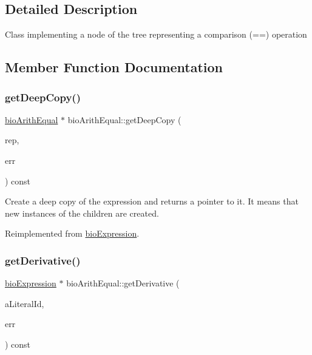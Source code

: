 \subsection{Detailed Description}
Class implementing a node of the tree representing a comparison (==) operation 

\subsection{Member Function Documentation}
\mbox{\label{classbio_arith_equal_a01b4bf9f63da99bf1ef17c518d2f6eab}} 
\subsubsection{\texorpdfstring{get\+Deep\+Copy()}{getDeepCopy()}}
{\footnotesize\ttfamily \hyperlink{classbio_arith_equal}{bio\+Arith\+Equal} $\ast$ bio\+Arith\+Equal\+::get\+Deep\+Copy (\begin{DoxyParamCaption}\item[{\hyperlink{classbio_expression_repository}{bio\+Expression\+Repository} $\ast$}]{rep,  }\item[{pat\+Error $\ast$\&}]{err }\end{DoxyParamCaption}) const\hspace{0.3cm}{\ttfamily [virtual]}}

Create a deep copy of the expression and returns a pointer to it. It means that new instances of the children are created. 

Reimplemented from \hyperlink{classbio_expression_a4ee1b8add634078a02eaae26cd40dcc8}{bio\+Expression}.

\mbox{\label{classbio_arith_equal_a91d4c7481582a8a039dc373eddc707b8}} 
\subsubsection{\texorpdfstring{get\+Derivative()}{getDerivative()}}
{\footnotesize\ttfamily \hyperlink{classbio_expression}{bio\+Expression} $\ast$ bio\+Arith\+Equal\+::get\+Derivative (\begin{DoxyParamCaption}\item[{pat\+U\+Long}]{a\+Literal\+Id,  }\item[{pat\+Error $\ast$\&}]{err }\end{DoxyParamCaption}) const\hspace{0.3cm}{\ttfamily [virtual]}}

